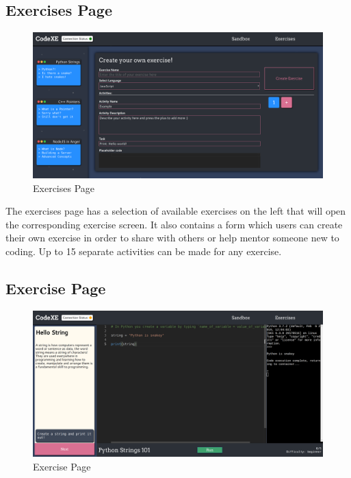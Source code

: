 \subsection{Exercises Page}

\begin{figure}[h!]
    \centering
    \includegraphics[width=\linewidth]{res/exercises_page.png}
    \caption{Exercises Page}
    \label{fig:exercisespage}
\end{figure}

The exercises page has a selection of available exercises on the left that will open the corresponding exercise screen. It also contains a form which users can create their own exercise in order to share with others or help mentor someone new to coding. Up to 15 separate activities can be made for any exercise.

\subsection{Exercise Page}

\begin{figure}[h!]
\centering
    \includegraphics[width=\linewidth]{res/exercise_page.png}
    \caption{Exercise Page}
    \label{fig:exercisepage}
\end{figure}

